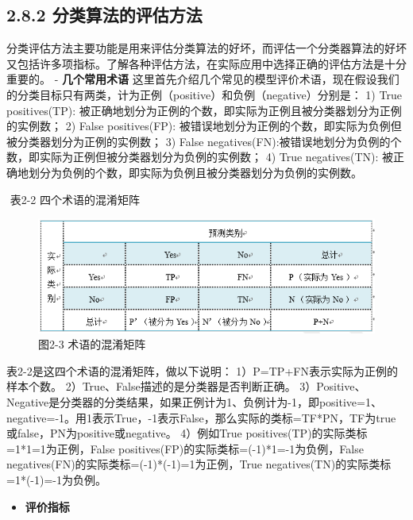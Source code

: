 \subsection{2.8.2
分类算法的评估方法}\label{ux5206ux7c7bux7b97ux6cd5ux7684ux8bc4ux4f30ux65b9ux6cd5}

​
分类评估方法主要功能是用来评估分类算法的好坏，而评估一个分类器算法的好坏又包括许多项指标。了解各种评估方法，在实际应用中选择正确的评估方法是十分重要的。
- \textbf{几个常用术语} ​
这里首先介绍几个常见的模型评价术语，现在假设我们的分类目标只有两类，计为正例（positive）和负例（negative）分别是：
1) True positives(TP):
被正确地划分为正例的个数，即实际为正例且被分类器划分为正例的实例数； 2)
False positives(FP):
被错误地划分为正例的个数，即实际为负例但被分类器划分为正例的实例数； 3)
False
negatives(FN):被错误地划分为负例的个数，即实际为正例但被分类器划分为负例的实例数；
4) True negatives(TN):
被正确地划分为负例的个数，即实际为负例且被分类器划分为负例的实例数。　

​ 表2-2 四个术语的混淆矩阵

\begin{figure}
\centering
\includegraphics{./img/ch2/2.9/1.png}
\caption{图2-3 术语的混淆矩阵}
\end{figure}

表2-2是这四个术语的混淆矩阵，做以下说明：
1）P=TP+FN表示实际为正例的样本个数。
2）True、False描述的是分类器是否判断正确。
3）Positive、Negative是分类器的分类结果，如果正例计为1、负例计为-1，即positive=1、negative=-1。用1表示True，-1表示False，那么实际的类标=TF*PN，TF为true或false，PN为positive或negative。
4）例如True positives(TP)的实际类标=1*1=1为正例，False
positives(FP)的实际类标=(-1)*1=-1为负例，False
negatives(FN)的实际类标=(-1)*(-1)=1为正例，True
negatives(TN)的实际类标=1*(-1)=-1为负例。

\begin{itemize}
\item
  \textbf{评价指标}
\end{itemize}

